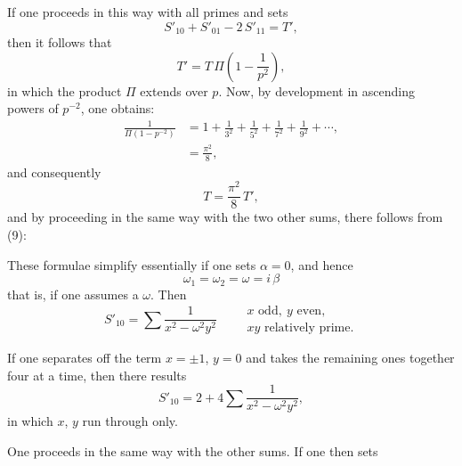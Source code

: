
If one proceeds in this way with all primes and sets
\[
S'_{10} + S'_{01} - 2\,S'_{11} = T',
\]
then it follows that
\[
T' = T\,\Pi\left(1 - \frac{1}{p^2}\right),
\]
in which the product $\Pi$ extends over  $p$. Now, by development in
ascending powers of $p^{-2}$, one obtains:
\[
\begin{aligned}
\frac{1}{\Pi(1-p^{-2})} &= 1 + \frac{1}{3^2} + \frac{1}{5^2} + \frac{1}{7^2} + \frac{1}{9^2} + \cdots,\\
&= \frac{\pi^2}{8},
\end{aligned}
\]
and consequently
\[
T = \frac{\pi^2}{8}\,T',
\]
and by proceeding in the same way with the two other sums, there follows from (9):

These formulae simplify essentially if one sets $\alpha = 0$, and hence
\[
\omega_1 = \omega_2 = \omega = i\,\beta
\]
that is, if one assumes a  $\omega$. Then
\[
S'_{10} = \sum \frac{1}{x^2 - \omega^2 y^2} \qquad \begin{array}{l}x \text{ odd}, \ y \text{ even},\\xy \text{ relatively prime}.\end{array}
\]

If one separates off the term $x = \pm 1$, $y = 0$ and takes the remaining ones together four
at a time, then there results
\[
S'_{10} = 2 + 4\sum \frac{1}{x^2 - \omega^2 y^2},
\]
in which $x$, $y$ run through  only.

One proceeds in the same way with the other sums. If one then sets
